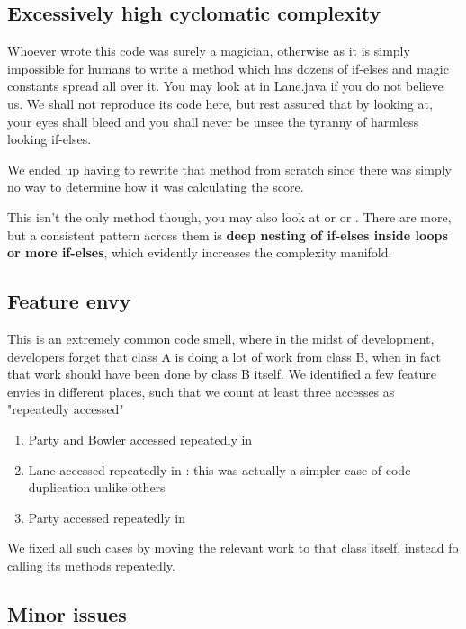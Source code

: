 \subsection{Excessively high cyclomatic complexity}

Whoever wrote this code was surely a magician, otherwise as it is simply impossible for humans to write a method which has dozens of if-elses and magic constants spread all over it. You may look at  in Lane.java if you do not believe us. We shall not reproduce its code here, but rest assured that by looking at, your eyes shall bleed and you shall never be unsee the tyranny of harmless looking if-elses.

We ended up having to rewrite that method from scratch since there was simply no way to determine how it was calculating the score.

This isn't the only method though, you may also look at  or  or . There are more, but a consistent pattern across them is \textbf{deep nesting of if-elses inside loops or more if-elses}, which evidently increases the complexity manifold.

\subsection{Feature envy}

This is an extremely common code smell, where in the midst of development, developers forget that class A is doing a lot of work from class B, when in fact that work should have been done by class B itself. We identified a few feature envies in different places, such that we count at least three accesses as "repeatedly accessed"

\begin{enumerate}
	\item Party and Bowler accessed repeatedly in 
	\item Lane accessed repeatedly in : this was actually a simpler case of code duplication unlike others
	\item Party accessed repeatedly in 
\end{enumerate}

We fixed all such cases by moving the relevant work to that class itself, instead fo calling its methods repeatedly.

\subsection{Minor issues}

